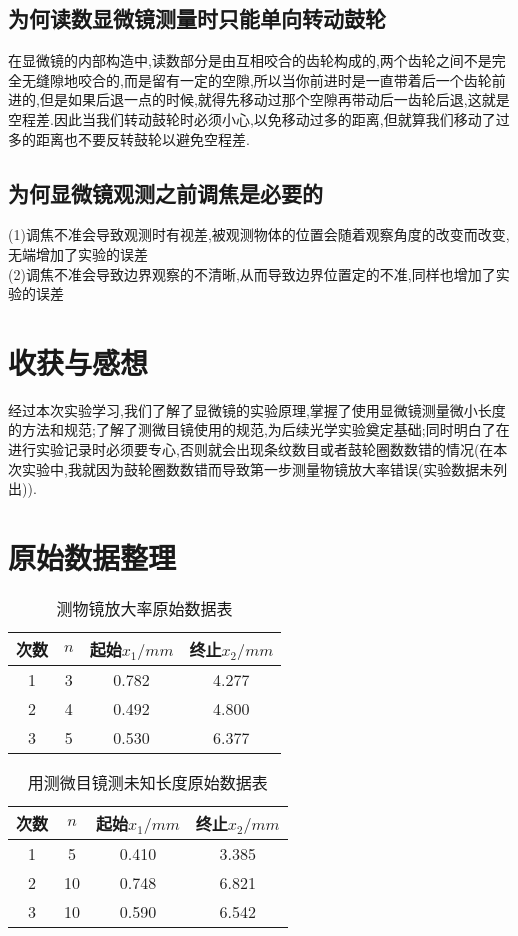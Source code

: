 \documentclass[a4 paper,12pt]{article}
\begin{document}
\subsection{为何读数显微镜测量时只能单向转动鼓轮}
 在显微镜的内部构造中,读数部分是由互相咬合的齿轮构成的,两个齿轮之间不是完全无缝隙地咬合的,而是留有一定的空隙,所以当你前进时是一直带着后一个齿轮前进的,但是如果后退一点的时候,就得先移动过那个空隙再带动后一齿轮后退,这就是空程差.因此当我们转动鼓轮时必须小心,以免移动过多的距离,但就算我们移动了过多的距离也不要反转鼓轮以避免空程差.
\subsection{为何显微镜观测之前调焦是必要的}
\noindent
(1)调焦不准会导致观测时有视差,被观测物体的位置会随着观察角度的改变而改变,无端增加了实验的误差\\
(2)调焦不准会导致边界观察的不清晰,从而导致边界位置定的不准,同样也增加了实验的误差

\section{收获与感想}

   经过本次实验学习,我们了解了显微镜的实验原理,掌握了使用显微镜测量微小长度的方法和规范;了解了测微目镜使用的规范,为后续光学实验奠定基础;同时明白了在进行实验记录时必须要专心,否则就会出现条纹数目或者鼓轮圈数数错的情况(在本次实验中,我就因为鼓轮圈数数错而导致第一步测量物镜放大率错误(实验数据未列出)).

\section{原始数据整理}

\begin{table}[H] 
	\caption{测物镜放大率原始数据表}
	\label{测物镜放大率原始数据表}
	\centering
		\begin{tabular}{cccc}
			\toprule
			次数 &$ n $& 起始$x_{1}/mm $ & 终止$x_{2}/mm$  \\
			\midrule
			1 & 3  & 0.782  & 4.277  \\
			2 & 4 & 0.492  & 4.800   \\
			3 & 5  & 0.530  & 6.377  \\
			\bottomrule[0.5mm]
	\end{tabular}
\end{table}

\begin{table}[H] 
	\caption{用测微目镜测未知长度原始数据表}
	\label{用测微目镜测未知长度原始数据表}
	\centering
		\begin{tabular}{cccc}
			\toprule[0.5mm]
			次数 &$ n$ & 起始$x_{1}/mm $ & 终止$x_{2}/mm$  \\
			\midrule
			1 & 5  & 0.410  & 3.385  \\
			2 & 10 & 0.748  & 6.821   \\
			3 & 10  & 0.590  & 6.542  \\
			\bottomrule[0.5mm]
	\end{tabular}
\end{table}
\end{document}
